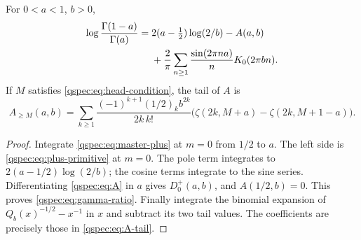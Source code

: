 \begin{corollary}\label{qspec:cor:gamma-ratio}
For $0<a<1$, $b>0$,
\begin{align}
\log\frac{\Gamma(1-a)}{\Gamma(a)}={}&
2(a-\tfrac12)\log(2/b)-A(a,b)\notag\\
&+\frac2\pi\sum_{n\ge1}\frac{\sin(2\pi na)}nK_0(2\pi bn).
\label{qspec:eq:gamma-ratio}
\end{align}
If $M$ satisfies \eqref{qspec:eq:head-condition}, the tail of $A$ is
\begin{equation}\label{qspec:eq:A-tail}
A_{\ge M}(a,b)=\sum_{k\ge1}
\frac{(-1)^{k+1}(1/2)_k b^{2k}}{2k\,k!}
\bigl(\zeta(2k,M+a)-\zeta(2k,M+1-a)\bigr).
\end{equation}
\end{corollary}
\begin{proof}
Integrate \eqref{qspec:eq:master-plus} at $m=0$ from $1/2$ to $a$.
The left side is \eqref{qspec:eq:plus-primitive} at $m=0$.
The pole term integrates to $2(a-1/2)\log(2/b)$; the cosine terms
integrate to the sine series. Differentiating \eqref{qspec:eq:A} in $a$
gives $D_0^+(a,b)$, and $A(1/2,b)=0$. This proves
\eqref{qspec:eq:gamma-ratio}. Finally integrate the binomial expansion
of $Q_b(x)^{-1/2}-x^{-1}$ in $x$ and subtract its two tail values.
The coefficients are precisely those in \eqref{qspec:eq:A-tail}.
\end{proof}
